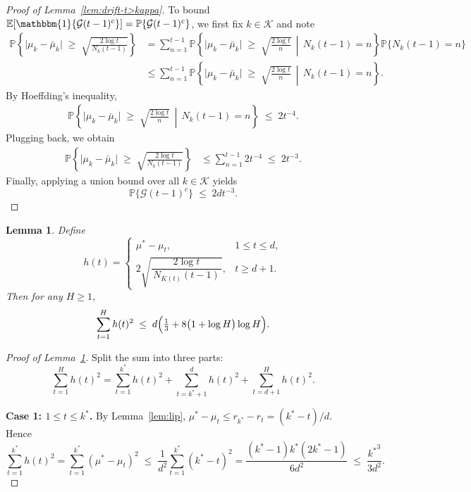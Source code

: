 \documentclass[12pt,draftcls, onecolumn]{IEEEtran}
\newcommand{\EE}{\mathbb{E}}
\newtheorem{lemma}{Lemma}
\begin{document}
{\begin{proof}[Proof of Lemma~\ref{lem:drift-t>kappa}]
To bound $\EE\!\left[\mathbbm{1}\{\mathcal{G}(t-1)^c\}\right] = \mathbb{P}\{\mathcal{G}(t-1)^c\}$, we first fix $k \in \mathcal{K}$ and note
\begin{align*}
    \mathbb{P}\!\left\{ \big|\mu_k - \bar\mu_k\big| \;\geq\; \sqrt{\tfrac{2\log t}{N_k(t-1)}} \right\}
    &=
    \sum_{n=1}^{t-1}
    \mathbb{P}\!\left\{ \big|\mu_k - \bar\mu_k\big| \;\geq\; \sqrt{\tfrac{2\log t}{n}} \,\middle|\, N_k(t-1) = n \right\}
    \mathbb{P}\{N_k(t-1) = n\}  \\
    &\leq
    \sum_{n=1}^{t-1}
    \mathbb{P}\!\left\{ \big|\mu_k - \bar\mu_k\big| \;\geq\; \sqrt{\tfrac{2\log t}{n}} \,\middle|\, N_k(t-1) = n \right\}.
\end{align*}
By Hoeffding's inequality,
\begin{align*}
     \mathbb{P}\!\left\{ \big|\mu_k - \bar\mu_k\big| \;\geq\; \sqrt{\tfrac{2\log t}{n}} \,\middle|\, N_k(t-1) = n \right\}
     \;\leq\; 2 t^{-4}.
\end{align*}
Plugging back, we obtain
\begin{align*}
    \mathbb{P}\!\left\{ \big|\mu_k - \bar\mu_k\big| \;\geq\; \sqrt{\tfrac{2\log t}{N_k(t-1)}} \right\}
    &\leq
    \sum_{n=1}^{t-1} 2 t^{-4}
    \;\leq\; 2 t^{-3}.
\end{align*}
Finally, applying a union bound over all $k \in \mathcal{K}$ yields
\[
    \mathbb{P}\{\mathcal{G}(t-1)^c\} \;\leq\; 2 d t^{-3}.
\]


\end{proof}




\begin{lemma}\label{lem:H2-sum}
Define
\[
h(t) = 
\begin{cases}
\mu^* - \mu_t, 
&1 \le t \le {d},\\[6pt]
2\sqrt{\dfrac{2\log t}{\,N_{K(t)}(t-1)\,}}, 
&t \ge {d}+1.
\end{cases}
\]
Then for any \(H\ge1\),
\[
\sum_{t=1}^H h(t)^2
\;\le\;
{d}\Bigl(\tfrac{1}{3} + 8\bigl(1+\log H\bigr)\log H\Bigr).
\]
\end{lemma}
\begin{proof}[Proof of Lemma~\ref{lem:H2-sum}]
Split the sum into three parts:
\[
\sum_{t=1}^H h(t)^2
=
\sum_{t=1}^{k^*} h(t)^2
+
\sum_{t=k^*+1}^{{d}} h(t)^2
+
\sum_{t={d}+1}^H h(t)^2.
\]

\noindent\textbf{Case 1: \(1\le t\le k^*\).}  By Lemma~\ref{lem:lip}, \(\mu^*-\mu_t\le r_{k^*}-r_t =  (k^*-t)/{d}\).  Hence
\[
\sum_{t=1}^{k^*}h(t)^2
=\sum_{t=1}^{k^*}(\mu^*-\mu_t)^2
\;\le\;
\frac{1}{{d}^2}\sum_{t=1}^{k^*}(k^*-t)^2
=\frac{(k^*-1)k^*(2k^*-1)}{6{d}^2}
\;\le\;
\frac{{k^*}^3}{3{d}^2}.
\]


\end{proof}}
\end{document}
